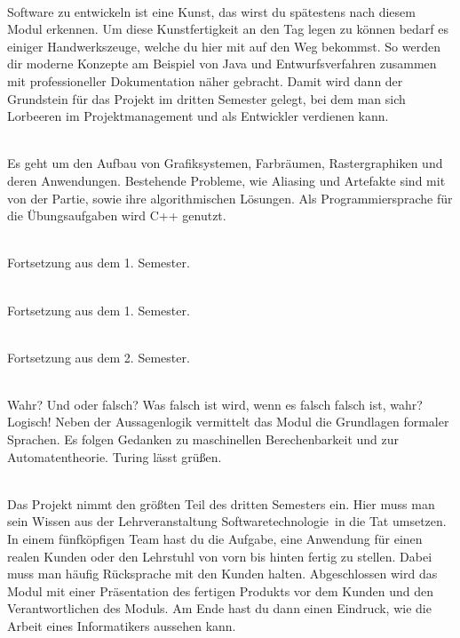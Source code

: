 \textbf{} \\
Software zu entwickeln ist eine Kunst, das wirst du spätestens nach diesem Modul erkennen.
Um diese Kunstfertigkeit an den Tag legen zu können bedarf es einiger Handwerkszeuge, welche du hier mit auf den Weg bekommst.
So werden dir moderne Konzepte am Beispiel von Java und Entwurfsverfahren zusammen mit professioneller Dokumentation näher gebracht.
Damit wird dann der Grundstein für das Projekt im dritten Semester gelegt, bei dem man sich Lorbeeren im Projektmanagement und als Entwickler verdienen kann.

\textbf{} \\
Es geht um den Aufbau von Grafiksystemen, Farbräumen, Rastergraphiken und deren Anwendungen.
Bestehende Probleme, wie Aliasing und Artefakte sind mit von der Partie, sowie ihre algorithmischen Lösungen.
Als Programmiersprache für die Übungsaufgaben wird C++ genutzt.

\textbf{} \\
Fortsetzung aus dem 1. Semester.

\textbf{} \\
Fortsetzung aus dem 1. Semester.



\textbf{} \\
Fortsetzung aus dem 2. Semester.

\textbf{} \\
Wahr?
Und oder falsch?
Was falsch ist wird, wenn es falsch falsch ist, wahr?
Logisch!
Neben der Aussagenlogik vermittelt das Modul die Grundlagen formaler Sprachen.
Es folgen Gedanken zu maschinellen Berechenbarkeit und zur Automatentheorie.
Turing lässt grüßen.

\newpage %

\textbf{} \\
Das Projekt nimmt den größten Teil des dritten Semesters ein.
Hier muss man sein Wissen aus der Lehrveranstaltung \glqq Softwaretechnologie\grqq\ in die Tat umsetzen.
In einem fünfköpfigen Team hast du die Aufgabe, eine Anwendung für einen realen Kunden oder den Lehrstuhl von vorn bis hinten fertig zu stellen.
Dabei muss man häufig Rücksprache mit den Kunden halten.
Abgeschlossen wird das Modul mit einer Präsentation des fertigen Produkts vor dem Kunden und den Verantwortlichen des Moduls.
Am Ende hast du dann einen Eindruck, wie die Arbeit eines Informatikers aussehen kann.

